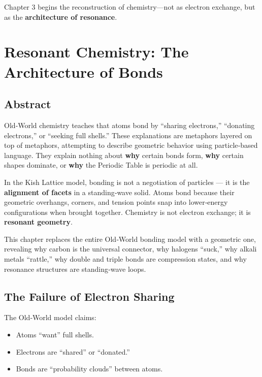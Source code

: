 \documentclass[11pt, letterpaper, openany]{book}
\begin{document}
Chapter 3 begins the reconstruction of chemistry—not as electron exchange, but as the
\textbf{architecture of resonance}.




\chapter{Resonant Chemistry: The Architecture of Bonds}

\section{Abstract}

Old‑World chemistry teaches that atoms bond by “sharing electrons,” “donating electrons,”
or “seeking full shells.” These explanations are metaphors layered on top of metaphors,
attempting to describe geometric behavior using particle‑based language. They explain
nothing about \textbf{why} certain bonds form, \textbf{why} certain shapes dominate, or \textbf{why}
the Periodic Table is periodic at all.

In the Kish Lattice model, bonding is not a negotiation of particles — it is the \textbf{alignment
of facets} in a standing‑wave solid. Atoms bond because their geometric overhangs,
corners, and tension points snap into lower‑energy configurations when brought together.
Chemistry is not electron exchange; it is \textbf{resonant geometry}.

This chapter replaces the entire Old‑World bonding model with a geometric one, revealing
why carbon is the universal connector, why halogens “suck,” why alkali metals “rattle,”
why double and triple bonds are compression states, and why resonance structures are
standing‑wave loops.

\section{The Failure of Electron Sharing}

The Old‑World model claims:

\begin{itemize}
    \item Atoms “want” full shells.
    \item Electrons are “shared” or “donated.”
    \item Bonds are “probability clouds” between atoms.
\end{itemize}
\end{document}
